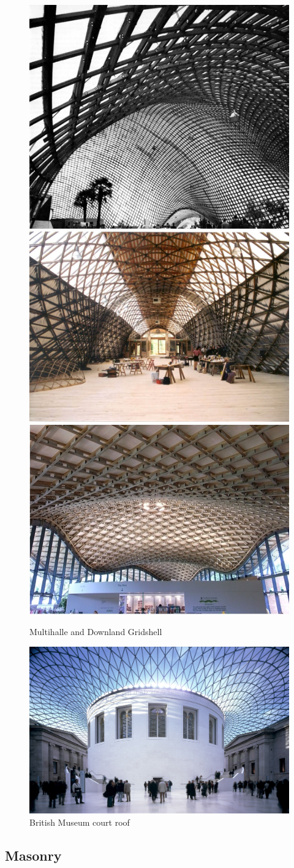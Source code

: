 \begin{figure}[H]
\centering
\includegraphics[width=0.3\linewidth ]{figure/Introduction/DownlandC.jpg}
\includegraphics[width=0.3\linewidth ]{figure/Introduction/Downland.jpg}
\includegraphics[width=0.3\linewidth ]{figure/Introduction/Savill.jpg}
\caption{Multihalle and Downland Gridshell}
\end{figure}

\begin{figure}[H]
\centering
\includegraphics[width=0.9\linewidth ]{figure/Introduction/TheGreatCourt.jpg}
\caption{British Museum court roof}
\end{figure}


\subsection{Masonry}

